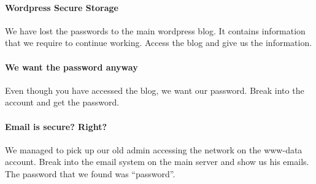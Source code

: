 				\paragraph{Wordpress Secure Storage}
					We have lost the passwords to the main wordpress blog. 
					It contains information that we require to continue working. 
					Access the blog and give us the information.

				\paragraph{We want the password anyway}
					Even though you have accessed the blog, we want our password. 
					Break into the account and get the password. 

				\paragraph{Email is secure? Right?}
					We managed to pick up our old admin accessing the network on the www-data account. 
					Break into the email system on the main server and show us his emails. 
					The password that we found was ``password''. 

